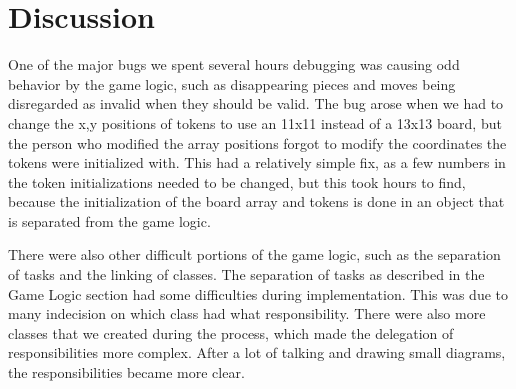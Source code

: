 \documentclass{article}
\begin{document}
\section{Discussion}
	One of the major bugs we spent several hours debugging was causing odd behavior by the game logic, such as disappearing pieces and moves being disregarded as invalid when they should be valid. The bug arose when we had to change the x,y positions of tokens to use an 11x11 instead of a 13x13 board, but the person who modified the array positions forgot to modify the coordinates the tokens were initialized with. This had a relatively simple fix, as a few numbers in the token initializations needed to be changed, but this took hours to find, because the initialization of the board array and tokens is done in an object that is separated from the game logic. \par
	There were also other difficult portions of the game logic, such as the separation of tasks and the linking of classes. The separation of tasks as described in the Game Logic section had some difficulties during implementation. This was due to many indecision on which class had what responsibility. There were also more classes that we created during the process, which made the delegation of responsibilities more complex. After a lot of talking and drawing small diagrams, the responsibilities became more clear.\par
\end{document}
